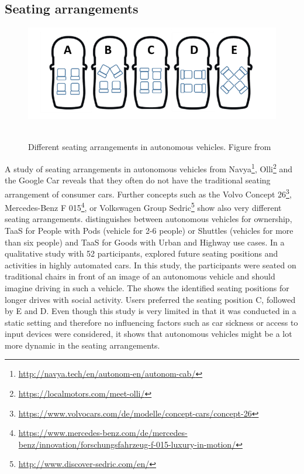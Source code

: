 \subsection{Seating arrangements}\label{ssec:seating}
\begin{figure}
    \includegraphics[width=1\textwidth]{fig/seating}\hfill\
    \caption[Seating arrangements]{Different seating arrangements in autonomous vehicles. Figure from \cite{Jorlov2017}}
    \label{fig:seating}
\end{figure}
A study of seating arrangements in autonomous vehicles from Navya\footnote{\url{http://navya.tech/en/autonom-en/autonom-cab/}}, Olli\footnote{\url{https://localmotors.com/meet-olli/}} and the Google Car reveals that they often do not have the traditional seating arrangement of consumer cars. Further concepts such as the Volvo Concept 26\footnote{\url{https://www.volvocars.com/de/modelle/concept-cars/concept-26}}, Mercedes-Benz F 015\footnote{\url{https://www.mercedes-benz.com/de/mercedes-benz/innovation/forschungsfahrzeug-f-015-luxury-in-motion/}}, or Volkswagen Group Sedric\footnote{\url{http://www.discover-sedric.com/en/}} show also very different seating arrangements.  \citet{Jungwirth2017LeadershipGroup} distinguishes between autonomous vehicles for ownership, TaaS for People with Pods (vehicle for 2-6 people) or Shuttles (vehicles for more than six people) and TaaS for Goods with Urban and Highway use cases. In a qualitative study with 52 participants, \citet{Jorlov2017} explored future seating positions and activities in highly automated cars. In this study, the participants were seated on traditional chairs in front of an image of an autonomous vehicle and should imagine driving in such a vehicle. The \emph{} shows the identified seating positions for longer drives with social activity. Users preferred the seating position C, followed by E and D. Even though this study is very limited in that it was conducted in a static setting and therefore no influencing factors such as car sickness or access to input devices were considered, it shows that autonomous vehicles might be a lot more dynamic in the seating arrangements.  

